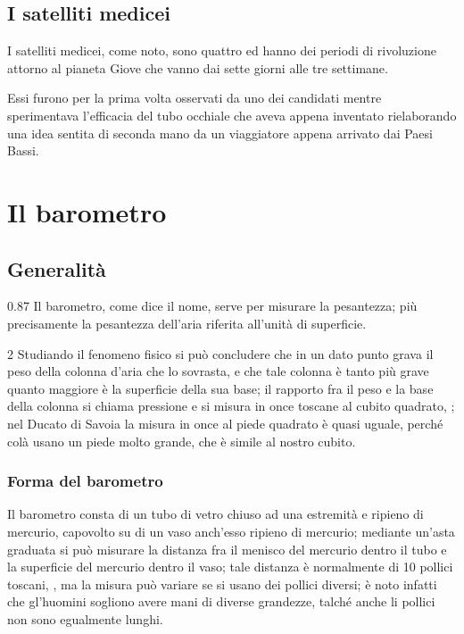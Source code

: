 \documentclass[%
    corpo=13pt,
    twoside,
    oldstyle,
    autoretitolo,
    greek,
    evenboxes,
]{toptesi}
\begin{document}
\section{I satelliti medicei}
I satelliti medicei, come noto, sono quattro ed hanno dei periodi di rivoluzione
attorno al pianeta Giove che vanno dai sette giorni alle tre settimane.

Essi furono per la prima volta osservati da uno dei candidati mentre
sperimentava l'efficacia del tubo occhiale che aveva appena inventato
rielaborando una idea sentita di seconda mano da un viaggiatore appena arrivato
dai Paesi Bassi.





\chapter{Il barometro}
\section{Generalit\`a}
\begin{interlinea}{0.87} Il barometro, come dice il nome, serve per
misurare la pesantezza; pi\`u precisamente la pesantezza dell'aria
riferita all'unit\`a di superficie.
\end{interlinea}

\begin{interlinea}{2} Studiando il fenomeno fisico si pu\`o concludere
che in un dato punto grava il peso della colonna d'aria che lo
sovrasta, e che tale colonna \`e tanto pi\`u grave quanto maggiore
\`e la superficie della sua base; il rapporto fra il peso e la base
della colonna si chiama pressione e si misura in once toscane al cubito
quadrato, \cite{tor1}; nel Ducato di Savoia la misura in once al piede
quadrato \`e quasi uguale, perch\'e col\`a usano un piede molto
grande, che \`e simile al nostro cubito.
\end{interlinea}

\subsection{Forma del barometro}
Il barometro consta di un tubo di vetro chiuso ad una estremit\`a e
ripieno di mercurio, capovolto su di un vaso anch'esso ripieno di
mercurio; mediante un'asta graduata si pu\`o misurare la distanza fra
il menisco del mercurio dentro il tubo e la superficie del mercurio
dentro il vaso; tale distanza \`e normalmente di 10 pollici toscani,
\cite{tor1,tor2}, ma la misura pu\`o variare se si usano dei pollici
diversi; \`e noto infatti che gl'huomini sogliono avere mani di
diverse grandezze, talch\'e anche li pollici non sono egualmente
lunghi.
\end{document}
